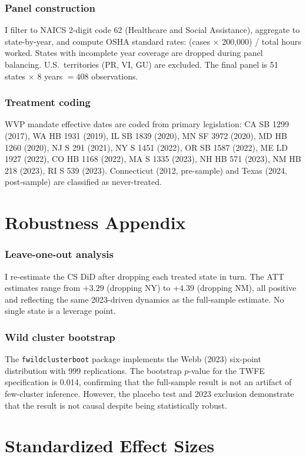 \documentclass[12pt]{article}
\begin{document}
\subsubsection*{Panel construction} I filter to NAICS 2-digit code 62 (Healthcare and Social Assistance), aggregate to state-by-year, and compute OSHA standard rates: (cases $\times$ 200,000) / total hours worked. States with incomplete year coverage are dropped during panel balancing. U.S.\ territories (PR, VI, GU) are excluded. The final panel is 51 states $\times$ 8 years $= 408$ observations.

\subsubsection*{Treatment coding} WVP mandate effective dates are coded from primary legislation: CA SB 1299 (2017), WA HB 1931 (2019), IL SB 1839 (2020), MN SF 3972 (2020), MD HB 1260 (2020), NJ S 291 (2021), NY S 1451 (2022), OR SB 1587 (2022), ME LD 1927 (2022), CO HB 1168 (2022), MA S 1335 (2023), NH HB 571 (2023), NM HB 218 (2023), RI S 539 (2023). Connecticut (2012, pre-sample) and Texas (2024, post-sample) are classified as never-treated.

\section{Robustness Appendix}

\subsubsection*{Leave-one-out analysis} I re-estimate the CS DiD after dropping each treated state in turn. The ATT estimates range from $+3.29$ (dropping NY) to $+4.39$ (dropping NM), all positive and reflecting the same 2023-driven dynamics as the full-sample estimate. No single state is a leverage point.

\subsubsection*{Wild cluster bootstrap} The \texttt{fwildclusterboot} package \citep{roodman2019} implements the Webb (2023) six-point distribution with 999 replications. The bootstrap $p$-value for the TWFE specification is 0.014, confirming that the full-sample result is not an artifact of few-cluster inference. However, the placebo test and 2023 exclusion demonstrate that the result is not causal despite being statistically robust.

\section{Standardized Effect Sizes}
\label{sec:sde}


\end{document}
